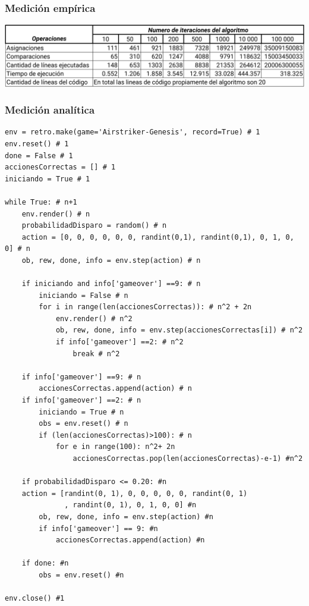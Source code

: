 \documentclass{article}
\begin{document}
\subsubsection{Medición empírica}
\begin{center}
  \includegraphics[scale=0.25]{prob/med-emp.png}
\end{center}

\subsubsection{Medición analítica}
\begin{verbatim}
env = retro.make(game='Airstriker-Genesis', record=True) # 1
env.reset() # 1
done = False # 1
accionesCorrectas = [] # 1
iniciando = True # 1

while True: # n+1
    env.render() # n
    probabilidadDisparo = random() # n
    action = [0, 0, 0, 0, 0, 0, randint(0,1), randint(0,1), 0, 1, 0, 0] # n
    ob, rew, done, info = env.step(action) # n

    if iniciando and info['gameover'] ==9: # n
        iniciando = False # n
        for i in range(len(accionesCorrectas)): # n^2 + 2n
            env.render() # n^2
            ob, rew, done, info = env.step(accionesCorrectas[i]) # n^2
            if info['gameover'] ==2: # n^2
                break # n^2

    if info['gameover'] ==9: # n
        accionesCorrectas.append(action) # n
    if info['gameover'] ==2: # n
        iniciando = True # n
        obs = env.reset() # n
        if (len(accionesCorrectas)>100): # n
            for e in range(100): n^2+ 2n
                accionesCorrectas.pop(len(accionesCorrectas)-e-1) #n^2

    if probabilidadDisparo <= 0.20: #n
    action = [randint(0, 1), 0, 0, 0, 0, 0, randint(0, 1)
              , randint(0, 1), 0, 1, 0, 0] #n
        ob, rew, done, info = env.step(action) #n
        if info['gameover'] == 9: #n
            accionesCorrectas.append(action) #n

    if done: #n
        obs = env.reset() #n

env.close() #1
\end{verbatim}
\end{document}
